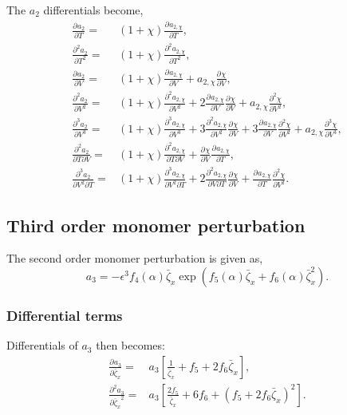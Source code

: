 \documentclass[english]{../thermomemo/thermomemo}
\newcommand*{\pd}[3][]{\frac{\partial^{#1}#2}{\partial{#3}^{#1}}}%
\newcommand*{\pdc}[3]{\frac{\partial^{2}#1}{\partial{#2}\partial{#3}}}%
\newcommand*{\pdcc}[3]{\frac{\partial^{3}#1}{\partial{#2}^{2}\partial{#3}}}%
\newcommand*{\lb}{\left(}
\newcommand*{\rb}{\right)}
\newcommand{\zb}{\bar{\zeta}}
\begin{document}
The $a_2$ differentials become,
\begin{align}
  \label{eq:a_2_split_diff}
  \pd{a_2}{T} =& \lb 1 + \chi \rb \pd{a_{2,\chi}}{T}, \\
  \pd[2]{a_2}{T} =& \lb 1 + \chi \rb \pd[2]{a_{2,\chi}}{T}, \\
  \pd{a_2}{V} =& \lb 1 + \chi \rb \pd{a_{2,\chi}}{V} + a_{2,\chi} \pd{\chi}{V}, \\
  \pd[2]{a_2}{V} =& \lb 1 + \chi \rb \pd[2]{a_{2,\chi}}{V} + 2\pd{a_{2,\chi}}{V} \pd{\chi}{V} + a_{2,\chi} \pd[2]{\chi}{V}, \\
  \pd[3]{a_2}{V} =& \lb 1 + \chi \rb \pd[3]{a_{2,\chi}}{V} + 3\pd[2]{a_{2,\chi}}{V} \pd{\chi}{V} + 3\pd{a_{2,\chi}}{V} \pd[2]{\chi}{V} + a_{2,\chi} \pd[3]{\chi}{V}, \\
  \pdc{a_2}{T}{V} =& \lb 1 + \chi \rb \pdc{a_{2,\chi}}{T}{V} + \pd{\chi}{V} \pd{a_{2,\chi}}{T}, \\
  \pdcc{a_2}{V}{T} =& \lb 1 + \chi \rb \pdcc{a_{2,\chi}}{V}{T} + 2\pdc{a_{2,\chi}}{V}{T} \pd{\chi}{V} + \pd{a_{2,\chi}}{T} \pd[2]{\chi}{V}.
\end{align}

\subsection{Third order monomer perturbation}
The second order monomer perturbation is given as,
\begin{equation}
  \label{eq:a_3}
  a_3 = -\epsilon^3 f_4 \lb \alpha \rb \zb_x \exp \lb f_5 \lb \alpha \rb \zb_x + f_6 \lb \alpha \rb \zb_x^2\rb.
\end{equation}


\subsubsection{Differential terms}

Differentials of $a_3$ then becomes:
\begin{align}
  \label{eq:a_3_diff}
  \pd{a_3}{\zb_x} =& a_3\left[\frac{1}{\zb_x} + f_5  + 2 f_6 \zb_x \right], \\
  \pd[2]{a_3}{\zb_x} =& a_3\left[\frac{2f_5}{\zb_x}  + 6f_6 + \lb f_5  + 2 f_6 \zb_x \rb^2 \right].
\end{align}
\end{document}
